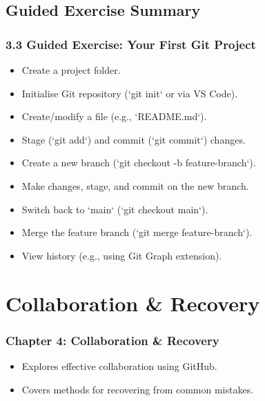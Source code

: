\documentclass{beamer}
\begin{document}
\subsection{Guided Exercise Summary}
\begin{frame}
  \frametitle{3.3 Guided Exercise: Your First Git Project}
  \begin{itemize}
    \item Create a project folder.
    \item Initialise Git repository (`git init` or via VS Code).
    \item Create/modify a file (e.g., `README.md`).
    \item Stage (`git add`) and commit (`git commit`) changes.
    \item Create a new branch (`git checkout -b feature-branch`).
    \item Make changes, stage, and commit on the new branch.
    \item Switch back to `main` (`git checkout main`).
    \item Merge the feature branch (`git merge feature-branch`).
    \item View history (e.g., using Git Graph extension).
  \end{itemize}
\end{frame}

\section{Collaboration \& Recovery}
\begin{frame}
  \frametitle{Chapter 4: Collaboration \& Recovery}
  \begin{itemize}
    \item Explores effective collaboration using GitHub.
    \item Covers methods for recovering from common mistakes.
  \end{itemize}
\end{frame}
\end{document}
